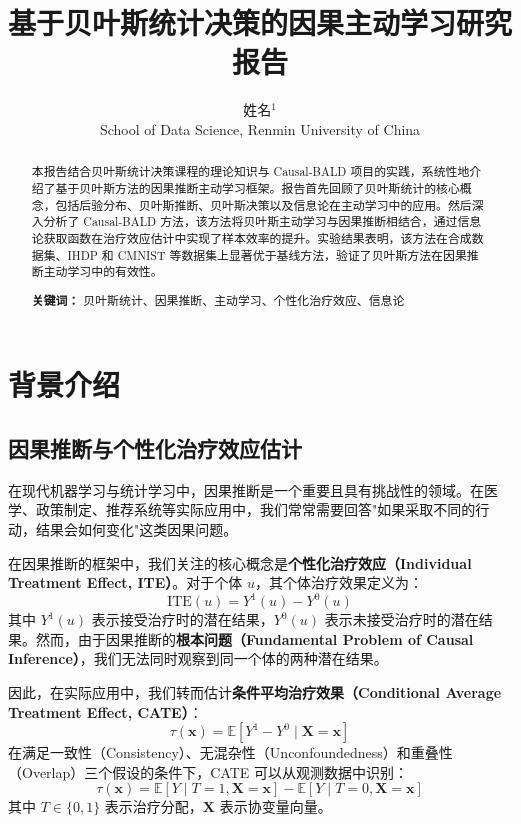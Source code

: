 \documentclass[12pt]{article}
\begin{document}
\title{基于贝叶斯统计决策的因果主动学习研究报告}
\date{}

\author{姓名$^1$	\\
School of Data Science, Renmin University of China
}

\maketitle

\begin{abstract}
本报告结合贝叶斯统计决策课程的理论知识与 Causal-BALD 项目的实践，系统性地介绍了基于贝叶斯方法的因果推断主动学习框架。报告首先回顾了贝叶斯统计的核心概念，包括后验分布、贝叶斯推断、贝叶斯决策以及信息论在主动学习中的应用。然后深入分析了 Causal-BALD 方法，该方法将贝叶斯主动学习与因果推断相结合，通过信息论获取函数在治疗效应估计中实现了样本效率的提升。实验结果表明，该方法在合成数据集、IHDP 和 CMNIST 等数据集上显著优于基线方法，验证了贝叶斯方法在因果推断主动学习中的有效性。

\textbf{关键词：} 贝叶斯统计、因果推断、主动学习、个性化治疗效应、信息论
\end{abstract}

\section{背景介绍}

\subsection{因果推断与个性化治疗效应估计}

在现代机器学习与统计学习中，因果推断是一个重要且具有挑战性的领域。在医学、政策制定、推荐系统等实际应用中，我们常常需要回答"如果采取不同的行动，结果会如何变化"这类因果问题。

在因果推断的框架中，我们关注的核心概念是\textbf{个性化治疗效应（Individual Treatment Effect, ITE）}。对于个体 $u$，其个体治疗效果定义为：
\begin{equation}
\text{ITE}(u) = Y^1(u) - Y^0(u)
\end{equation}
其中 $Y^1(u)$ 表示接受治疗时的潜在结果，$Y^0(u)$ 表示未接受治疗时的潜在结果。然而，由于因果推断的\textbf{根本问题（Fundamental Problem of Causal Inference）}，我们无法同时观察到同一个体的两种潜在结果。

因此，在实际应用中，我们转而估计\textbf{条件平均治疗效果（Conditional Average Treatment Effect, CATE）}：
\begin{equation}
\tau(\mathbf{x}) = \mathbb{E}[Y^1 - Y^0 \mid \mathbf{X} = \mathbf{x}]
\end{equation}
在满足一致性（Consistency）、无混杂性（Unconfoundedness）和重叠性（Overlap）三个假设的条件下，CATE 可以从观测数据中识别：
\begin{equation}
\tau(\mathbf{x}) = \mathbb{E}[Y \mid T=1, \mathbf{X}=\mathbf{x}] - \mathbb{E}[Y \mid T=0, \mathbf{X}=\mathbf{x}]
\end{equation}
其中 $T \in \{0,1\}$ 表示治疗分配，$\mathbf{X}$ 表示协变量向量。
\end{document}
